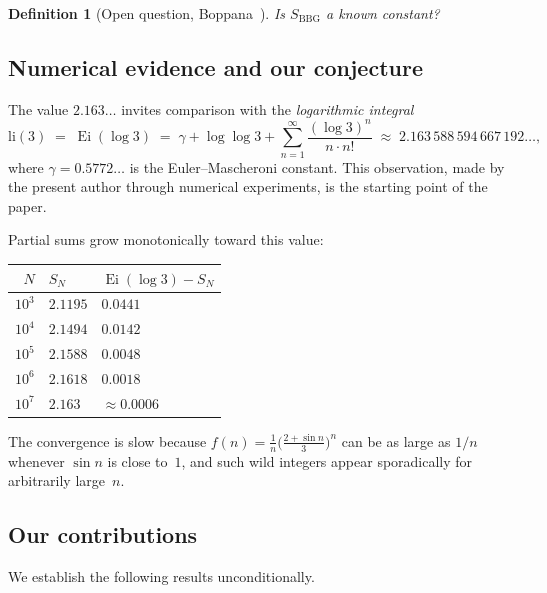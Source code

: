\documentclass[12pt]{amsart}
\newtheorem{definition}[theorem]{Definition}
\DeclareMathOperator{\Ei}{Ei}
\newcommand{\li}{\mathrm{li}}
\begin{document}
\begin{definition}[Open question, Boppana~\cite{Boppana2020}]
\label{q:value}
Is $S_{\mathrm{BBG}}$ a known constant?
\end{definition}

\subsection{Numerical evidence and our conjecture}

The value $2.163\ldots$ invites comparison with the
\emph{logarithmic integral}
\[
  \li(3) \;=\; \Ei(\log 3)
        \;=\; \gamma + \log\log 3
              + \sum_{n=1}^{\infty}\frac{(\log 3)^n}{n\cdot n!}
        \;\approx\; 2.163\,588\,594\,667\,192\ldots,
\]
where $\gamma=0.5772\ldots$ is the Euler--Mascheroni constant.
This observation, made by the present author through numerical
experiments, is the starting point of the paper.

Partial sums grow monotonically toward this value:
\begin{center}
\begin{tabular}{rll}
\hline
$N$ & $S_N$ & $\Ei(\log 3)-S_N$ \\
\hline
$10^3$ & $2.1195$ & $0.0441$ \\
$10^4$ & $2.1494$ & $0.0142$ \\
$10^5$ & $2.1588$ & $0.0048$ \\
$10^6$ & $2.1618$ & $0.0018$ \\
$10^7$ & $2.163\phantom{0}$ & $\approx 0.0006$ \\
\hline
\end{tabular}
\end{center}
The convergence is slow because $f(n)=\tfrac{1}{n}
\bigl(\tfrac{2+\sin n}{3}\bigr)^n$ can be as large as $1/n$ whenever
$\sin n$ is close to~$1$, and such wild integers appear sporadically
for arbitrarily large~$n$.

\subsection{Our contributions}

We establish the following results unconditionally.
\end{document}
